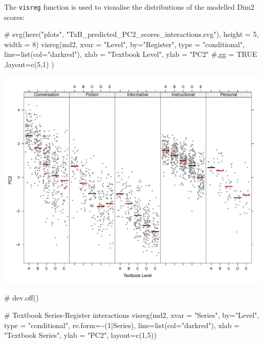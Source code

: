 \documentclass[
  letterpaper,
  DIV=11,
  numbers=noendperiod]{scrreprt}
\newenvironment{Shaded}{\begin{snugshade}}{\end{snugshade}}
\newcommand{\AttributeTok}[1]{\textcolor[rgb]{0.40,0.45,0.13}{#1}}
\newcommand{\CommentTok}[1]{\textcolor[rgb]{0.37,0.37,0.37}{#1}}
\newcommand{\DecValTok}[1]{\textcolor[rgb]{0.68,0.00,0.00}{#1}}
\newcommand{\FunctionTok}[1]{\textcolor[rgb]{0.28,0.35,0.67}{#1}}
\newcommand{\NormalTok}[1]{\textcolor[rgb]{0.00,0.23,0.31}{#1}}
\newcommand{\SpecialCharTok}[1]{\textcolor[rgb]{0.37,0.37,0.37}{#1}}
\newcommand{\StringTok}[1]{\textcolor[rgb]{0.13,0.47,0.30}{#1}}
\begin{document}
The \texttt{visreg} function is used to visualise the distributions of
the modelled Dim2 scores:

\begin{Shaded}
\begin{Highlighting}[]
\CommentTok{\# svg(here("plots", "TxB\_predicted\_PC2\_scores\_interactions.svg"), height = 5, width = 8)}
\FunctionTok{visreg}\NormalTok{(md2, }\AttributeTok{xvar =} \StringTok{"Level"}\NormalTok{, }\AttributeTok{by=}\StringTok{"Register"}\NormalTok{, }\AttributeTok{type =} \StringTok{"conditional"}\NormalTok{,}
       \AttributeTok{line=}\FunctionTok{list}\NormalTok{(}\AttributeTok{col=}\StringTok{"darkred"}\NormalTok{), }
       \AttributeTok{xlab =} \StringTok{"Textbook Level"}\NormalTok{, }\AttributeTok{ylab =} \StringTok{"PC2"}
       \CommentTok{\#,gg = TRUE}
\NormalTok{       ,}\AttributeTok{layout=}\FunctionTok{c}\NormalTok{(}\DecValTok{5}\NormalTok{,}\DecValTok{1}\NormalTok{)}
\NormalTok{)}
\end{Highlighting}
\end{Shaded}

\includegraphics{AppendixF_files/figure-pdf/Dim2estimateplots-1.pdf}

\begin{Shaded}
\begin{Highlighting}[]
\CommentTok{\# dev.off()}

\CommentTok{\# Textbook Series{-}Register interactions}
\FunctionTok{visreg}\NormalTok{(md2, }\AttributeTok{xvar =} \StringTok{"Series"}\NormalTok{, }\AttributeTok{by=}\StringTok{"Level"}\NormalTok{, }\AttributeTok{type =} \StringTok{"conditional"}\NormalTok{, }\AttributeTok{re.form=}\SpecialCharTok{\textasciitilde{}}\NormalTok{(}\DecValTok{1}\SpecialCharTok{|}\NormalTok{Series), }
       \AttributeTok{line=}\FunctionTok{list}\NormalTok{(}\AttributeTok{col=}\StringTok{"darkred"}\NormalTok{), }\AttributeTok{xlab =} \StringTok{"Textbook Series"}\NormalTok{, }\AttributeTok{ylab =} \StringTok{"PC2"}\NormalTok{,}
       \AttributeTok{layout=}\FunctionTok{c}\NormalTok{(}\DecValTok{1}\NormalTok{,}\DecValTok{5}\NormalTok{))}
\end{Highlighting}
\end{Shaded}
\end{document}
